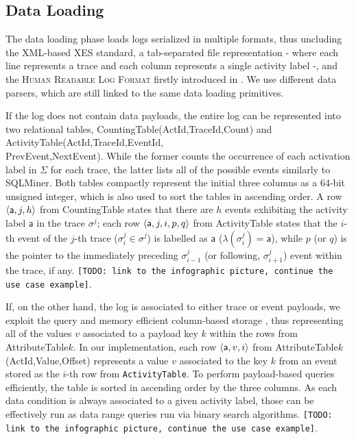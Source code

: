 \subsection{Data Loading}\label{ssec:dl}
The data loading phase   loads logs  serialized in multiple  formats, thus uncluding the XML-based XES standard, a tab-separated file representation - where each line represents a trace and each column represents a single activity label -, and the \textsc{Human Readable Log Format} firstly introduced in \cite{bpm21}. We use different data parsers, which are still linked to the same data loading primitives. 

If the log does not contain data payloads, the entire log can be represented into two relational tables, \textsf{CountingTable(ActId,TraceId,Count)} and \textsf{ActivityTable(ActId,TraceId,EventId,\\PrevEvent,NextEvent)}. While the former counts the occurrence of each activation label in $\Sigma$ for each trace, the latter lists all of the possible events similarly to SQLMiner. Both tables compactly represent the initial three columns as a 64-bit unsigned integer, which is also used to sort the tables in ascending order. A row $\braket{\textsf{a},j,h}$ from \textsf{CountingTable} states that there are $h$ events exhibiting the activity label $\textsf{a}$ in the trace $\sigma^j$; each row $\braket{\textsf{a},j,i,p,q}$ from \textsf{ActivityTable} states that the $i$-th event of the $j$-th trace ($\sigma^j_i\in \sigma^j$) is labelled as $\textsf{a}$ ($\lambda(\sigma^j_i)=\textsf{a}$), while $p$ (or $q$) is the pointer to the immediately preceding $\sigma^j_{i-1}$ (or  following, $\sigma^j_{i+1}$) event within the trace, if any.  \texttt{\color{red}[TODO: link to the infographic picture, continue the use case example]}. 

If, on the other hand, the log is associated to either trace or event payloads, we exploit 
the query and memory efficient  column-based storage \cite{IdreosGNMMK12}, thus representing all of the values $v$ associated to a  payload key $k$ within the rows from  \textsf{AttributeTable$k$}. In our implementation, each row $\braket{\textsf{a},v,i}$ from  \textsf{AttributeTable$k$(ActId,Value,Offset)} represents a value $v$ associated to the key $k$ from an event stored as the $i$-th row from \texttt{ActivityTable}. To perform payload-based queries efficiently, the table is sorted in ascending order by the  three columns. As each data condition is always associated to a given activity label, those can be effectively run as data range queries run via binary search algorithms. \texttt{\color{red}[TODO: link to the infographic picture, continue the use case example]}. 

